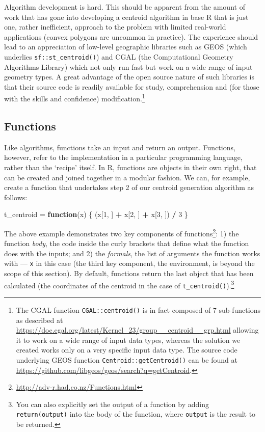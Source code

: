 \documentclass[]{krantz}
\newenvironment{Shaded}{\begin{snugshade}}{\end{snugshade}}
\newcommand{\ControlFlowTok}[1]{\textcolor[rgb]{0.27,0.27,0.27}{\textbf{#1}}}
\newcommand{\DecValTok}[1]{\textcolor[rgb]{0.06,0.06,0.06}{#1}}
\newcommand{\NormalTok}[1]{#1}
\newcommand{\OperatorTok}[1]{\textcolor[rgb]{0.43,0.43,0.43}{\textbf{#1}}}
\newcommand{\StringTok}[1]{\textcolor[rgb]{0.5,0.5,0.5}{#1}}
\let\rmarkdownfootnote\footnote%
\def\footnote{\protect\rmarkdownfootnote}
\renewcommand{\href}[2]{#2\footnote{\url{#1}}}
\begin{document}
Algorithm development is hard.
This should be apparent from the amount of work that has gone into developing a centroid algorithm in base R that is just one, rather inefficient, approach to the problem with limited real-world applications (convex polygons are uncommon in practice).
The experience should lead to an appreciation of low-level geographic libraries such as GEOS (which underlies \texttt{sf::st\_centroid()}) and CGAL (the Computational Geometry Algorithms Library) which not only run fast but work on a wide range of input geometry types.
A great advantage of the open source nature of such libraries is that their source code is readily available for study, comprehension and (for those with the skills and confidence) modification.\footnote{The CGAL function \texttt{CGAL::centroid()} is in fact composed of 7 sub-functions as described at \url{https://doc.cgal.org/latest/Kernel_23/group__centroid__grp.html} allowing it to work on a wide range of input data types, whereas the solution we created works only on a very specific input data type.
  The source code underlying GEOS function \texttt{Centroid::getCentroid()} can be found at \url{https://github.com/libgeos/geos/search?q=getCentroid}.}

\hypertarget{functions}{%
\subsection{Functions}\label{functions}}

Like algorithms, functions take an input and return an output.
Functions, however, refer to the implementation in a particular programming language, rather than the `recipe' itself.
In R, functions are objects in their own right, that can be created and joined together in a modular fashion.
We can, for example, create a function that undertakes step 2 of our centroid generation algorithm as follows:

\begin{Shaded}
\begin{Highlighting}[]
\NormalTok{t_centroid =}\StringTok{ }\ControlFlowTok{function}\NormalTok{(x) \{}
\NormalTok{  (x[}\DecValTok{1}\NormalTok{, ] }\OperatorTok{+}\StringTok{ }\NormalTok{x[}\DecValTok{2}\NormalTok{, ] }\OperatorTok{+}\StringTok{ }\NormalTok{x[}\DecValTok{3}\NormalTok{, ]) }\OperatorTok{/}\StringTok{ }\DecValTok{3}
\NormalTok{\}}
\end{Highlighting}
\end{Shaded}

The above example demonstrates two key components of \href{http://adv-r.had.co.nz/Functions.html}{functions}:
1) the function \emph{body}, the code inside the curly brackets that define what the function does with the inputs; and 2) the \emph{formals}, the list of arguments the function works with --- \texttt{x} in this case (the third key component, the environment, is beyond the scope of this section).
By default, functions return the last object that has been calculated (the coordinates of the centroid in the case of \texttt{t\_centroid()}).\footnote{You can also explicitly set the output of a function by adding \texttt{return(output)} into the body of the function, where \texttt{output} is the result to be returned.}
\end{document}
